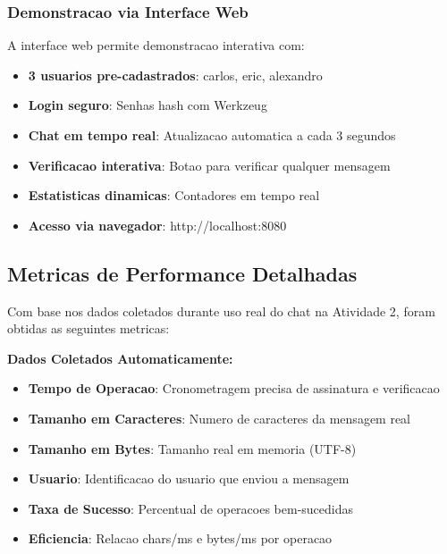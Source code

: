 \documentclass[12pt,a4paper,oneside]{article}
\begin{document}
\subsubsection{Demonstracao via Interface Web}

A interface web permite demonstracao interativa com:

\begin{itemize}
    \item \textbf{3 usuarios pre-cadastrados}: carlos, eric, alexandro
    \item \textbf{Login seguro}: Senhas hash com Werkzeug
    \item \textbf{Chat em tempo real}: Atualizacao automatica a cada 3 segundos
    \item \textbf{Verificacao interativa}: Botao para verificar qualquer mensagem
    \item \textbf{Estatisticas dinamicas}: Contadores em tempo real
    \item \textbf{Acesso via navegador}: http://localhost:8080
\end{itemize}

\subsection{Metricas de Performance Detalhadas}

Com base nos dados coletados durante uso real do chat na Atividade 2, foram obtidas as seguintes metricas:

\textbf{Dados Coletados Automaticamente:}
\begin{itemize}
    \item \textbf{Tempo de Operacao}: Cronometragem precisa de assinatura e verificacao
    \item \textbf{Tamanho em Caracteres}: Numero de caracteres da mensagem real
    \item \textbf{Tamanho em Bytes}: Tamanho real em memoria (UTF-8)
    \item \textbf{Usuario}: Identificacao do usuario que enviou a mensagem
    \item \textbf{Taxa de Sucesso}: Percentual de operacoes bem-sucedidas
    \item \textbf{Eficiencia}: Relacao chars/ms e bytes/ms por operacao
\end{itemize}
\end{document}
